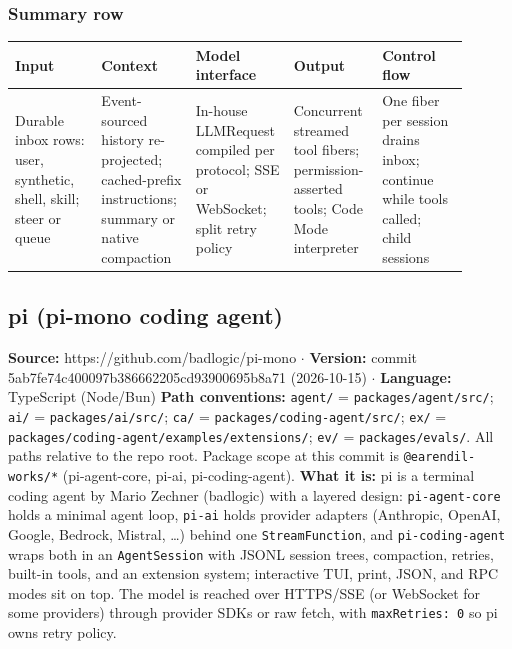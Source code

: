 \subsubsection*{Summary row}
\begin{longtable}{@{}p{0.18\linewidth}p{0.18\linewidth}p{0.18\linewidth}p{0.18\linewidth}p{0.18\linewidth}@{}}
\toprule \textbf{Input} & \textbf{Context} & \textbf{Model interface} & \textbf{Output} & \textbf{Control flow} \\ \midrule \endhead
Durable inbox rows: user, synthetic, shell, skill; steer or queue & Event-sourced history re-projected; cached-prefix instructions; summary or native compaction & In-house LLMRequest compiled per protocol; SSE or WebSocket; split retry policy & Concurrent streamed tool fibers; permission-asserted tools; Code Mode interpreter & One fiber per session drains inbox; continue while tools called; child sessions \\
\bottomrule \end{longtable}


\subsection{pi (pi-mono coding agent)}

\textbf{Source:} https://github.com/badlogic/pi-mono $\cdot$ \textbf{Version:} commit 5ab7fe74c400097b386662205cd93900695b8a71 (2026-10-15) $\cdot$ \textbf{Language:} TypeScript (Node/Bun)
\textbf{Path conventions:} \texttt{agent/\allowbreak{}} = \texttt{packages/\allowbreak{}agent/\allowbreak{}src/\allowbreak{}}; \texttt{ai/\allowbreak{}} = \texttt{packages/\allowbreak{}ai/\allowbreak{}src/\allowbreak{}}; \texttt{ca/\allowbreak{}} = \texttt{packages/\allowbreak{}coding-\allowbreak{}agent/\allowbreak{}src/\allowbreak{}}; \texttt{ex/\allowbreak{}} = \texttt{packages/\allowbreak{}coding-\allowbreak{}agent/\allowbreak{}examples/\allowbreak{}extensions/\allowbreak{}}; \texttt{ev/\allowbreak{}} = \texttt{packages/\allowbreak{}evals/\allowbreak{}}. All paths relative to the repo root. Package scope at this commit is \texttt{@earendil-\allowbreak{}works/\allowbreak{}*} (pi-agent-core, pi-ai, pi-coding-agent).
\textbf{What it is:} pi is a terminal coding agent by Mario Zechner (badlogic) with a layered design: \texttt{pi-\allowbreak{}agent-\allowbreak{}core} holds a minimal agent loop, \texttt{pi-\allowbreak{}ai} holds provider adapters (Anthropic, OpenAI, Google, Bedrock, Mistral, \ldots{}) behind one \texttt{StreamFunction}, and \texttt{pi-\allowbreak{}coding-\allowbreak{}agent} wraps both in an \texttt{AgentSession} with JSONL session trees, compaction, retries, built-in tools, and an extension system; interactive TUI, print, JSON, and RPC modes sit on top. The model is reached over HTTPS/SSE (or WebSocket for some providers) through provider SDKs or raw fetch, with \texttt{maxRetries:\allowbreak{} 0} so pi owns retry policy.

